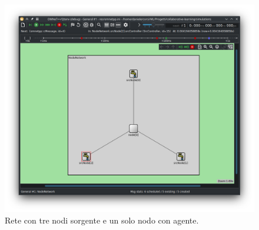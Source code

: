 \documentclass[conference]{IEEEtran}
\begin{document}
\begin{figure}
    \centering
    \includegraphics[width=\textwidth]{figs/network_layout_3queues.png}
    \caption{Rete con tre nodi sorgente e un solo nodo con agente.}
    \label{fig:network_layout_3queues}
\end{figure}
\end{document}
